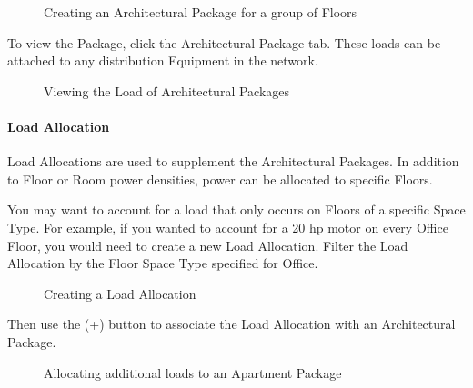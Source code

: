 \documentclass[letterpaper,10pt,english]{sphinxmanual}
\begin{document}
\begin{figure}[H]
\centering
\capstart

\noindent{}
\caption{Creating an Architectural Package for a group of Floors}\label{\detokenize{docs/userguide/definingarchitecturalelements/archelements/index-arch-elements:id5}}\end{figure}

To view the Package, click the Architectural Package tab.  These loads can be attached to any distribution Equipment in the network.

\begin{figure}[H]
\centering
\capstart

\noindent{}
\caption{Viewing the Load of Architectural Packages}\label{\detokenize{docs/userguide/definingarchitecturalelements/archelements/index-arch-elements:id6}}\end{figure}


\paragraph{Load Allocation}
\label{\detokenize{docs/userguide/definingarchitecturalelements/archelements/index-arch-elements:load-allocation}}\label{\detokenize{docs/userguide/definingarchitecturalelements/archelements/index-arch-elements:id2}}
Load Allocations are used to supplement the Architectural Packages.  In addition to Floor or Room power densities, power can be allocated to specific Floors.

You may want to account for a load that only occurs on Floors of a specific Space Type.  For example, if you wanted to account for a 20 hp motor on every Office Floor, you would need to create a new Load Allocation.  Filter the Load Allocation by the Floor Space Type specified for Office.

\begin{figure}[H]
\centering
\capstart

\noindent{}
\caption{Creating a Load Allocation}\label{\detokenize{docs/userguide/definingarchitecturalelements/archelements/index-arch-elements:id7}}\end{figure}

Then use the (+) button to associate the Load Allocation with an Architectural Package.

\begin{figure}[H]
\centering
\capstart

\noindent{}
\caption{Allocating additional loads to an Apartment Package}\label{\detokenize{docs/userguide/definingarchitecturalelements/archelements/index-arch-elements:id8}}\end{figure}
\end{document}

